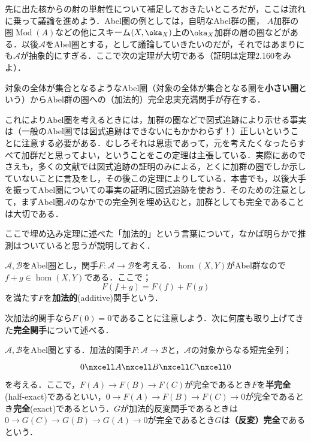 先に出た核からの射の単射性について補足しておきたいところだが，ここは流れに乗って議論を進めよう．Abel圏の例としては，自明なAbel群の圏， $A$加群の圏$\operatorname{Mod}(A)$などの他にスキーム$(X,\oka_X)$上の$\oka_X$加群の層の圏などがある．以後$\mathscr{A}$をAbel圏とする，として議論していきたいのだが，それではあまりにも$\mathscr{A}$が抽象的にすぎる．ここで次の定理が大切である（証明は\cite{siho}定理2.160をみよ）．

\begin{thm}\label{thm:埋め込み定理}
	対象の全体が集合となるようなAbel圏（対象の全体が集合となる圏を\textbf{小さい圏}という）からAbel群の圏への（加法的）完全忠実充満関手が存在する．
\end{thm}

これによりAbel圏を考えるときには，加群の圏などで図式追跡により示せる事実は（一般のAbel圏では図式追跡はできないにもかかわらず！）正しいということに注意する必要がある．むしろそれは恩恵であって，元を考えたくなったらすべて加群だと思ってよい，ということをこの定理は主張している．実際にあの\cite{harts}でさえも，多くの文献では図式追跡の証明のみによる，とくに加群の圏でしか示していないことに言及をし，その後この定理によりしている．本書でも，以後大手を振ってAbel圏についての事実の証明に図式追跡を使おう．そのための注意として，まずAbel圏$\mathscr{A}$のなかでの完全列を埋め込むと，加群としても完全であることは大切である．

ここで埋め込み定理に述べた「加法的」という言葉について，なかば明らかで推測はついていると思うが説明しておく．
\begin{defi}[加法的関手]
	$\mathscr{A,B}$をAbel圏とし，関手$F:\mathscr{A}\to\mathscr{B}$を考える．$\hom(X,Y)$がAbel群なので$f+g\in\hom(X,Y)$である．ここで；
	\[F(f+g)=F(f)+F(g)\]
	を満たす$F$を\textbf{加法的}(additive)関手という．
\end{defi}

次加法的関手なら$F(0)=0$であることに注意しよう．次に何度も取り上げてきた\textbf{完全関手}について述べる．

\begin{defi}[完全関手]
	$\mathscr{A,B}$をAbel圏とする．加法的関手$F:\mathscr{A}\to\mathscr{B}$と，$\mathscr{A}$の対象からなる短完全列；
	\[\begin{tikzcd}
		0\nxcell A\nxcell B\nxcell C\nxcell 0
	\end{tikzcd}\]
	を考える．ここで，$F(A)\to F(B)\to F(C)$が完全であるとき$F$を\textbf{半完全}(half-exact)であるといい，$0\to F(A)\to F(B)\to F(C)\to 0$が完全であるとき\textbf{完全}(exact)であるという．$G$が加法的反変関手であるときは$0\to G(C)\to G(B)\to G(A)\to0$が完全であるとき$G$は\textbf{（反変）完全}であるという．
\end{defi}

